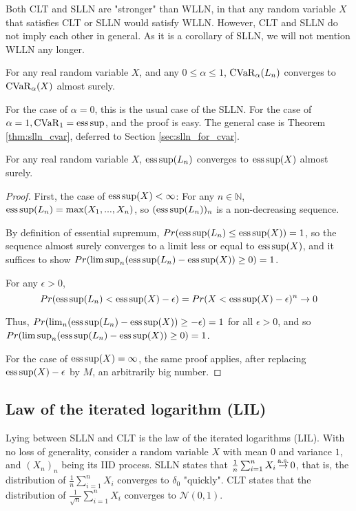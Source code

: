 Both CLT and SLLN are "stronger" than WLLN, in that any random variable $X$ that satisfies CLT or SLLN would satisfy WLLN. However, CLT and SLLN do not imply each other in general. As it is a corollary of SLLN, we will not mention WLLN any longer.

\begin{theorem}
For any real random variable $X$, and any $0\le \alpha \le 1$, $\operatorname{CVaR}_\alpha(L_n)$ converges to $\operatorname{CVaR}_\alpha(X)$ almost surely.
\end{theorem}

For the case of $\alpha = 0$, this is the usual case of the SLLN. For the case of $\alpha=1, \operatorname{CVaR}_1 = \operatorname*{ess\,sup}$, and the proof is easy. The general case is Theorem \ref{thm:slln_cvar}, deferred to Section \ref{sec:slln_for_cvar}.
\begin{theorem}
	\label{theorem:slln_esssup}
For any real random variable $X$,  $\operatorname*{ess\,sup}(L_n)$ converges to $\operatorname*{ess\,sup}(X)$ almost surely.
\end{theorem}
\begin{proof}
First, the case of $\operatorname*{ess\,sup}(X)<\infty$: For any $n\in\mathbb{N}$, 
$\operatorname*{ess\,sup}(L_n) = \max(X_1, ..., X_n)$, so $(\operatorname*{ess\,sup}(L_n))_n$ is a non-decreasing sequence. 

By definition of essential supremum, $Pr(\operatorname*{ess\,sup}(L_n) \le \operatorname*{ess\,sup}(X)) = 1$, so the sequence almost surely converges to a limit less or equal to $\operatorname*{ess\,sup}(X)$, and it suffices to show $Pr(\limsup_n (\operatorname*{ess\,sup}(L_n) - \operatorname*{ess\,sup}(X)) \ge 0) = 1$.

For any $\epsilon > 0$, 
$$Pr(\operatorname*{ess\,sup}(L_n) < \operatorname*{ess\,sup}(X)-\epsilon) = Pr(X<\operatorname*{ess\,sup}(X)-\epsilon)^n\to 0$$

Thus,  $Pr(\lim_n (\operatorname*{ess\,sup}(L_n) - \operatorname*{ess\,sup}(X)) \ge -\epsilon) = 1$ for all $\epsilon > 0$, and so $Pr(\limsup_n (\operatorname*{ess\,sup}(L_n) - \operatorname*{ess\,sup}(X)) \ge 0) = 1$.

For the case of $\operatorname*{ess\,sup}(X)=\infty$, the same proof applies, after replacing $\operatorname*{ess\,sup}(X)-\epsilon$ by $M$, an arbitrarily big number.
\end{proof}


\subsection{Law of the iterated logarithm (LIL)}
Lying between SLLN and CLT is the law of the iterated logarithms (LIL). With no loss of generality, consider a random variable $X$ with mean $0$ and variance $1$, and $(X_n)_n$ being its IID process. SLLN states that $\frac 1 n \sum_{i = 1}^n X_i \operatorname*{\stackrel{\text {a.s.}}{\rightarrow}} 0$, that is, the distribution of $\frac 1 n \sum_{i = 1}^n X_i$ converges to $\delta_0$ "quickly". CLT states that the distribution of $\frac{1}{\sqrt{n}} \sum_{i = 1}^n X_i$ converges to $\mathcal{N}(0, 1)$. 


